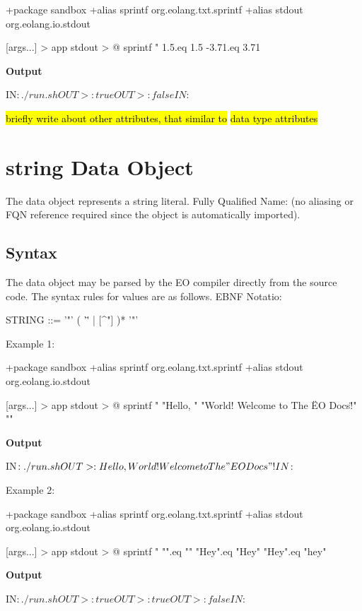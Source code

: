 \documentclass[12pt]{book}
\begin{document}
{\begin{ffcode}
+package sandbox
+alias sprintf org.eolang.txt.sprintf
+alias stdout org.eolang.io.stdout

[args...] > app
  stdout > @
    sprintf
      "%
      1.5.eq 1.5
      -3.71.eq 3.71
\end{ffcode}
\textbf{Output}
\begin{ffcode}
IN$: ./run.sh
OUT>: true
OUT>: false
IN$: 
\end{ffcode}

\hl{briefly write about other attributes, that similar to}  \hl{data type attributes}

\section{string Data Object} \label{seciotn:string}
The  data object represents a string literal.
Fully Qualified Name:  (no aliasing or FQN reference required since the object is automatically imported).

\subsection{Syntax}
The  data object may be parsed by the EO compiler directly from the source code. The syntax rules for values are as follows. EBNF Notatio:
\begin{ffcode}

STRING   ::= '"' ( '\"' | [^"] )* '"'
\end{ffcode}
Example 1:
\begin{ffcode}
+package sandbox
+alias sprintf org.eolang.txt.sprintf
+alias stdout org.eolang.io.stdout

[args...] > app
  stdout > @
    sprintf
      "%
      "Hello, "
      "World! Welcome to The \"EO Docs\"!"
      "\n"
\end{ffcode}
\textbf{Output}
\begin{ffcode}
IN$: ./run.sh
OUT>: Hello, World! Welcome to The "EO Docs"!
IN$: 
\end{ffcode}
Example 2:
\begin{ffcode}
+package sandbox
+alias sprintf org.eolang.txt.sprintf
+alias stdout org.eolang.io.stdout

[args...] > app
  stdout > @
    sprintf
      "%
      "".eq ""
      "Hey".eq "Hey"
      "Hey".eq "hey"
\end{ffcode}
\textbf{Output} 
\begin{ffcode}
IN$: ./run.sh
OUT>: true
OUT>: true
OUT>: false
IN$: 
\end{ffcode}

}
\end{document}
